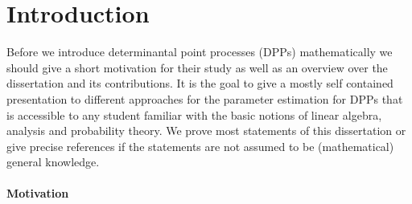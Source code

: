 \chapter*{Introduction}
\manualmark {}

Before we introduce determinantal point processes (DPPs) mathematically we should give a short motivation for their study as well as an overview over the dissertation and its contributions. It is the goal to give a mostly self contained presentation to different approaches for the parameter estimation for DPPs that is accessible to any student familiar with the basic notions of linear algebra, analysis and probability theory. We prove most statements of this dissertation or give precise references if the statements are not assumed to be (mathematical) general knowledge.

\subsubsection*{Motivation}

